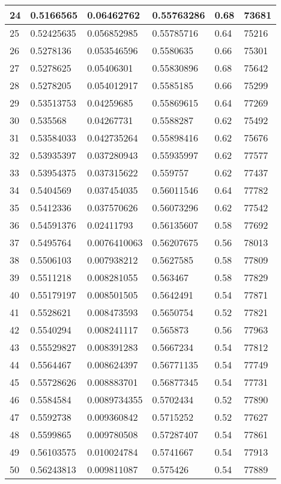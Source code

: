 \begin{longtable}{|l|l|l|l|l|l|}
24 & 0.5166565 & 0.06462762 & 0.55763286 & 0.68 & 73681 \\ \hline 
25 & 0.52425635 & 0.056852985 & 0.55785716 & 0.64 & 75216 \\ \hline 
26 & 0.5278136 & 0.053546596 & 0.5580635 & 0.66 & 75301 \\ \hline 
27 & 0.5278625 & 0.05406301 & 0.55830896 & 0.68 & 75642 \\ \hline 
28 & 0.5278205 & 0.054012917 & 0.5585185 & 0.66 & 75299 \\ \hline 
29 & 0.53513753 & 0.04259685 & 0.55869615 & 0.64 & 77269 \\ \hline 
30 & 0.535568 & 0.04267731 & 0.5588287 & 0.62 & 75492 \\ \hline 
31 & 0.53584033 & 0.042735264 & 0.55898416 & 0.62 & 75676 \\ \hline 
32 & 0.53935397 & 0.037280943 & 0.55935997 & 0.62 & 77577 \\ \hline 
33 & 0.53954375 & 0.037315622 & 0.559757 & 0.62 & 77437 \\ \hline 
34 & 0.5404569 & 0.037454035 & 0.56011546 & 0.64 & 77782 \\ \hline 
35 & 0.5412336 & 0.037570626 & 0.56073296 & 0.62 & 77542 \\ \hline 
36 & 0.54591376 & 0.02411793 & 0.56135607 & 0.58 & 77692 \\ \hline 
37 & 0.5495764 & 0.0076410063 & 0.56207675 & 0.56 & 78013 \\ \hline 
38 & 0.5506103 & 0.007938212 & 0.5627585 & 0.58 & 77809 \\ \hline 
39 & 0.5511218 & 0.008281055 & 0.563467 & 0.58 & 77829 \\ \hline 
40 & 0.55179197 & 0.008501505 & 0.5642491 & 0.54 & 77871 \\ \hline 
41 & 0.5528621 & 0.008473593 & 0.5650754 & 0.52 & 77821 \\ \hline 
42 & 0.5540294 & 0.008241117 & 0.565873 & 0.56 & 77963 \\ \hline 
43 & 0.55529827 & 0.008391283 & 0.5667234 & 0.54 & 77812 \\ \hline 
44 & 0.5564467 & 0.008624397 & 0.56771135 & 0.54 & 77749 \\ \hline 
45 & 0.55728626 & 0.008883701 & 0.56877345 & 0.54 & 77731 \\ \hline 
46 & 0.5584584 & 0.0089734355 & 0.5702434 & 0.52 & 77890 \\ \hline 
47 & 0.5592738 & 0.009360842 & 0.5715252 & 0.52 & 77627 \\ \hline 
48 & 0.5599865 & 0.009780508 & 0.57287407 & 0.54 & 77861 \\ \hline 
49 & 0.56103575 & 0.010024784 & 0.5741667 & 0.54 & 77913 \\ \hline 
50 & 0.56243813 & 0.009811087 & 0.575426 & 0.54 & 77889 \\ \hline 
\end{longtable}